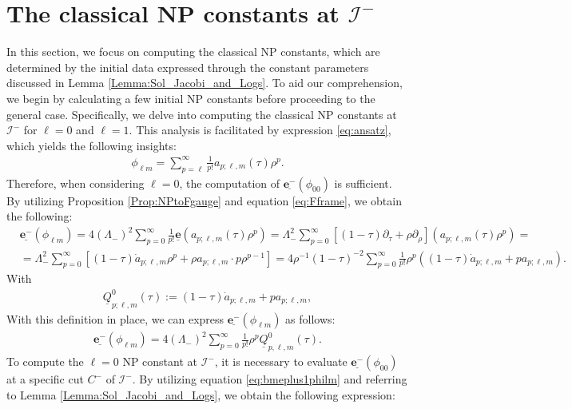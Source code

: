 \section{The classical NP constants at $\mathscr{I}^{-}$}
\label{sec:classicalNPminus}

In this section, we focus on computing the classical NP constants, which are determined by the initial data expressed through the constant parameters discussed in Lemma \ref{Lemma:Sol_Jacobi_and_Logs}. To aid our comprehension, we begin by calculating a few initial NP constants before proceeding to the general case. Specifically, we delve into computing the classical NP constants at $\mathscr{I}^{-}$ for $\ell=0$ and $\ell=1$. This analysis is facilitated by expression \eqref{eq:ansatz}, which yields the following insights:
\begin{align}\label{eq:exp_phi_lm}
  \phi_{\ell m}= \sum_{p=\ell}^{\infty}\frac{1}{p!}a_{p;\ell,m}(\tau)\rho^{p}.
\end{align}
Therefore, when considering $\ell=0$, the computation of $\underline{\boldsymbol{e}^{-}}(\phi_{00})$ is sufficient. By utilizing Proposition \ref{Prop:NPtoFgauge} and equation \eqref{eq:Fframe}, we obtain the following:
\begin{align}\label{eq:ubmeplus1philmraw}
   & \underline{\boldsymbol{e}^{-}}(\phi_{\ell m})= 4(\Lambda_{-})^{2}\sum_{p=0}^{\infty}\frac{1}{p!}\underline{\boldsymbol{e}}(a_{p;\ell,m}(\tau)\rho^{p}) = \Lambda_{-}^{2} \sum_{p=0}^{\infty} \left[(1-\tau) \partial_{\tau}+\rho \partial_{\rho}\right]\left(a_{p ; \ell, m}(\tau) \rho^{p}\right)= \nonumber \\
   & =\Lambda_{-}^{2} \sum_{p=0}^{\infty} \left[(1-\tau) \dot{a}_{p; \ell, m} \rho^{p}+\rho a_{p ; \ell, m} \cdot p \rho^{p-1}\right] = 4 \rho^{-1}(1-\tau)^{-2}\sum_{p=0}^{\infty} \frac{1}{p!}\rho^p((1-\tau)\dot{a}_{p;\ell,m}+p a_{p;\ell,m}).
\end{align}
With
\begin{align}\label{eq:defQu0}
  \underline{Q}^{0}_{p;\ell,m}(\tau):=(1-\tau)\dot{a}_{p;\ell,m}+p a_{p;\ell,m},
\end{align}
With this definition in place, we can express $\underline{\boldsymbol{e}^{-}}(\phi_{\ell m})$ as follows:
\begin{align}\label{eq:bumeplus1philm}
  \underline{\boldsymbol{e}^{-}}(\phi_{\ell m}) = 4 (\Lambda_{-})^{2}\sum_{p=0}^{\infty} \frac{1}{p!}\rho^{p}\underline{Q}^{0}_{p,\ell,m}(\tau).
\end{align}
To compute the $\ell=0$ NP constant at $\mathscr{I}^{-}$, it is necessary to evaluate $\underline{\boldsymbol{e}^{-}}(\phi_{00})$ at a specific cut ${C}^{-}$ of $\mathscr{I}^{-}$. By utilizing equation \eqref{eq:bmeplus1philm} and referring to Lemma \ref{Lemma:Sol_Jacobi_and_Logs}, we obtain the following expression:
